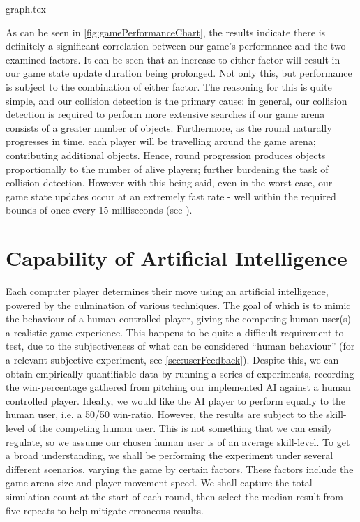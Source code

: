\documentclass{standalone}
\begin{document}
			{graph.tex}

			As can be seen in \autoref{fig:gamePerformanceChart}, the results indicate there is definitely a significant correlation between our game's performance and the two examined factors. It can be seen that an increase to either factor will result in our game state update duration being prolonged. Not only this, but performance is subject to the combination of either factor. The reasoning for this is quite simple, and our collision detection is the primary cause: in general, our collision detection is required to perform more extensive searches if our game arena consists of a greater number of objects. Furthermore, as the round naturally progresses in time, each player will be travelling around the game arena; contributing additional objects. Hence, round progression produces objects proportionally to the number of alive players; further burdening the task of collision detection. However with this being said, even in the worst case, our game state updates occur at an extremely fast rate - well within the required bounds of once every 15 milliseconds (see ).

	\section{Capability of Artificial Intelligence} \label{sec:aiCapabilities}
		Each computer player determines their move using an artificial intelligence, powered by the culmination of various techniques. The goal of which is to mimic the behaviour of a human controlled player, giving the competing human user(s) a realistic game experience. This happens to be quite a difficult requirement to test, due to the subjectiveness of what can be considered \enquote{human behaviour} (for a relevant subjective experiment, see \autoref{sec:userFeedback}). Despite this, we can obtain empirically quantifiable data by running a series of experiments, recording the win-percentage gathered from pitching our implemented AI against a human controlled player. Ideally, we would like the AI player to perform equally to the human user, i.e. a 50/50 win-ratio. However, the results are subject to the skill-level of the competing human user. This is not something that we can easily regulate, so we assume our chosen human user is of an average skill-level. To get a broad understanding, we shall be performing the experiment under several different scenarios, varying the game by certain factors. These factors include the game arena size and player movement speed. We shall capture the total simulation count at the start of each round, then select the median result from five repeats to help mitigate erroneous results.
\end{document}
